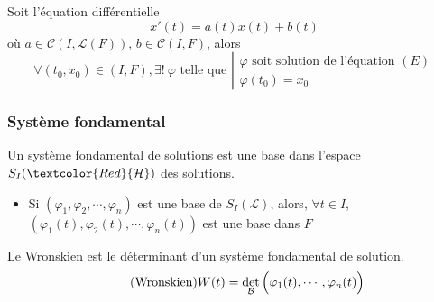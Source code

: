 \documentclass[11pt,a4paper,fleqn,pdftex]{report}
\begin{document}
\begin{itheorem}\label{th:CauchyLipschitz}
Soit l'équation différentielle 
\begin{equation}\tag{$E$}
 x'(t) = a(t) x(t) + b(t)
\end{equation}
où $a \in \mathcal{C}\left( I,\mathscr{L}(F)\right)$, $b\in \mathcal{C}(I,F)$, alors
\[
    \forall (t_0,x_0) \in (I,F), \exists ! \: \varphi \text{ telle que }
    \left|
    \begin{array}{l}
        \varphi \text{ soit solution de l'équation }(E)\\
        \varphi(t_0)=x_0
    \end{array}
    \right.
\]
\end{itheorem}

\subsubsection{Système fondamental}

\begin{dfn}

Un système fondamental de solutions est une base dans l'espace $S_I(\textcolor{Red}{\mathcal{H}})$ des solutions.
\end{dfn}

\begin{prop}
    \begin{itemize}
        \item Si $(\varphi_1, \varphi_2, \cdots , \varphi_n)$ est une base de $S_I(\mathscr{L})$, alors, $\forall t \in I$, $\left( \varphi_1(t), \varphi_2(t), \cdots , \varphi_n(t) \right)
$ est une base dans $ F$
    \end{itemize}
\end{prop}



\begin{dfn}[Wronskien]
Le Wronskien est le déterminant d'un système fondamental de solution. 
\begin{equation}\label{Wronskien}\tag{Wronskien}
  W(t) = \det_\mathcal{B}\left( \vphantom{{3^3}^3} \varphi_1(t),\cdots , \varphi_n(t) \right)
\end{equation}
\end{dfn}

\end{document}
